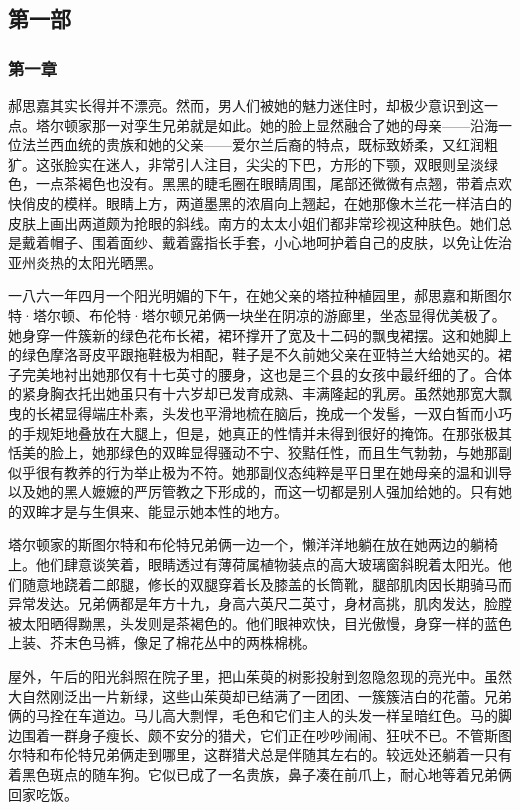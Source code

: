 \subsection{第一部}


\subsubsection{第一章}

\par 郝思嘉其实长得并不漂亮。然而，男人们被她的魅力迷住时，却极少意识到这一点。塔尔顿家那一对孪生兄弟就是如此。她的脸上显然融合了她的母亲——沿海一位法兰西血统的贵族和她的父亲——爱尔兰后裔的特点，既标致娇柔，又红润粗犷。这张脸实在迷人，非常引人注目，尖尖的下巴，方形的下颚，双眼则呈淡绿色，一点茶褐色也没有。黑黑的睫毛圈在眼睛周围，尾部还微微有点翘，带着点欢快俏皮的模样。眼睛上方，两道墨黑的浓眉向上翘起，在她那像木兰花一样洁白的皮肤上画出两道颇为抢眼的斜线。南方的太太小姐们都非常珍视这种肤色。她们总是戴着帽子、围着面纱、戴着露指长手套，小心地呵护着自己的皮肤，以免让佐治亚州炎热的太阳光晒黑。
\par 一八六一年四月一个阳光明媚的下午，在她父亲的塔拉种植园里，郝思嘉和斯图尔特·塔尔顿、布伦特·塔尔顿兄弟俩一块坐在阴凉的游廊里，坐态显得优美极了。她身穿一件簇新的绿色花布长裙，裙环撑开了宽及十二码的飘曳裙摆。这和她脚上的绿色摩洛哥皮平跟拖鞋极为相配，鞋子是不久前她父亲在亚特兰大给她买的。裙子完美地衬出她那仅有十七英寸的腰身，这也是三个县的女孩中最纤细的了。合体的紧身胸衣托出她虽只有十六岁却已发育成熟、丰满隆起的乳房。虽然她那宽大飘曳的长裙显得端庄朴素，头发也平滑地梳在脑后，挽成一个发髻，一双白皙而小巧的手规矩地叠放在大腿上，但是，她真正的性情并未得到很好的掩饰。在那张极其恬美的脸上，她那绿色的双眸显得骚动不宁、狡黠任性，而且生气勃勃，与她那副似乎很有教养的行为举止极为不符。她那副仪态纯粹是平日里在她母亲的温和训导以及她的黑人嬷嬷的严厉管教之下形成的，而这一切都是别人强加给她的。只有她的双眸才是与生俱来、能显示她本性的地方。
\par 塔尔顿家的斯图尔特和布伦特兄弟俩一边一个，懒洋洋地躺在放在她两边的躺椅上。他们肆意谈笑着，眼睛透过有薄荷属植物装点的高大玻璃窗斜睨着太阳光。他们随意地跷着二郎腿，修长的双腿穿着长及膝盖的长筒靴，腿部肌肉因长期骑马而异常发达。兄弟俩都是年方十九，身高六英尺二英寸，身材高挑，肌肉发达，脸膛被太阳晒得黝黑，头发则是茶褐色的。他们眼神欢快，目光傲慢，身穿一样的蓝色上装、芥末色马裤，像足了棉花丛中的两株棉桃。
\par 屋外，午后的阳光斜照在院子里，把山茱萸的树影投射到忽隐忽现的亮光中。虽然大自然刚泛出一片新绿，这些山茱萸却已结满了一团团、一簇簇洁白的花蕾。兄弟俩的马拴在车道边。马儿高大剽悍，毛色和它们主人的头发一样呈暗红色。马的脚边围着一群身子瘦长、颇不安分的猎犬，它们正在吵吵闹闹、狂吠不已。不管斯图尔特和布伦特兄弟俩走到哪里，这群猎犬总是伴随其左右的。较远处还躺着一只有着黑色斑点的随车狗。它似已成了一名贵族，鼻子凑在前爪上，耐心地等着兄弟俩回家吃饭。
